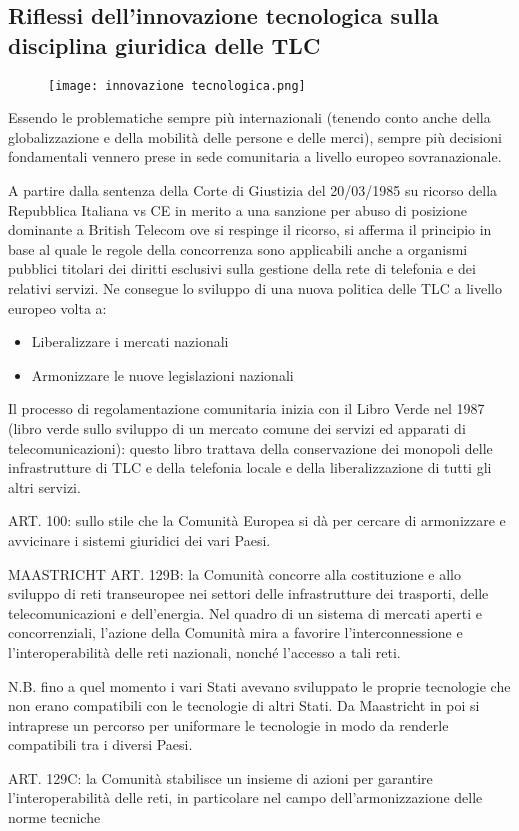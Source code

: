 \subsection{Riflessi dell'innovazione tecnologica sulla disciplina giuridica delle TLC}

\begin{figure}
    \centering
    \texttt{[image: innovazione tecnologica.png]}
\end{figure}


Essendo le problematiche sempre più internazionali (tenendo conto anche della globalizzazione e della mobilità delle persone e delle merci), sempre più decisioni fondamentali vennero prese in sede comunitaria a livello europeo sovranazionale. 

A partire dalla sentenza della Corte di Giustizia del 20/03/1985 su ricorso della Repubblica Italiana vs CE in merito a una sanzione per abuso di posizione dominante a British Telecom ove si respinge il ricorso, si afferma il principio in base al quale le regole della concorrenza sono applicabili anche a organismi pubblici titolari dei diritti esclusivi sulla gestione della rete di telefonia e dei relativi servizi. Ne consegue lo sviluppo di una nuova politica delle TLC a livello europeo volta a:
\begin{itemize}
    \item Liberalizzare i mercati nazionali
    \item Armonizzare le nuove legislazioni nazionali
\end{itemize}

Il processo di regolamentazione comunitaria inizia con il Libro Verde nel 1987 (libro verde sullo sviluppo di un mercato comune dei servizi ed apparati di telecomunicazioni): questo libro trattava della conservazione dei monopoli delle infrastrutture di TLC e della telefonia locale e della liberalizzazione di tutti gli altri servizi. 


ART. 100: sullo stile che la Comunità Europea si dà per cercare di armonizzare e avvicinare i sistemi giuridici dei vari Paesi. 


MAASTRICHT 
ART. 129B: la Comunità concorre alla costituzione e allo sviluppo di reti transeuropee nei settori delle infrastrutture dei trasporti, delle telecomunicazioni e dell'energia. Nel quadro di un sistema di mercati aperti e concorrenziali, l'azione della Comunità mira a favorire l'interconnessione e l'interoperabilità delle reti nazionali, nonché l'accesso a tali reti.

N.B. fino a quel momento i vari Stati avevano sviluppato le proprie tecnologie che non erano compatibili con le tecnologie di altri Stati. Da Maastricht in poi si intraprese un percorso per uniformare le tecnologie in modo da renderle compatibili tra i diversi Paesi.


ART. 129C: la Comunità stabilisce un insieme di azioni per garantire l'interoperabilità delle reti, in particolare nel campo dell'armonizzazione delle norme tecniche